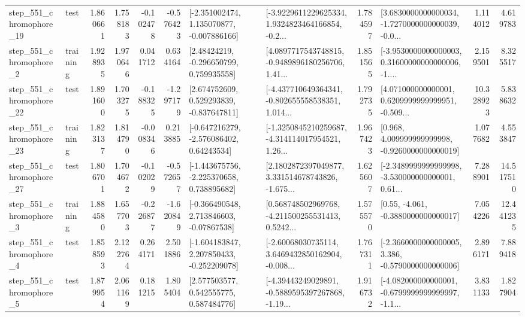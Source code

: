 \begin{tabular}{llrrrrllrlrr}
  step\_551\_chromophore\_19 &      test &      1.860661 &    1.758183 &     -0.102478 & -0.576423 &   [-2.351002474, 1.135070877, -0.007886166] &  [-3.9229611229625334, 1.9324823464166854, -0.2... &       1.784597 &  [3.6830000000000034, -1.7270000000000039, -0.0... &            1.114012 &          4.619783 \\
   step\_551\_chromophore\_2 &  training &      1.928935 &    1.970646 &      0.041712 &  0.634164 &     [2.48424219, -0.296650799, 0.759935558] &  [4.0897717543748815, -0.9489896180256706, 1.41... &       1.851565 &  [-3.9530000000000003, 0.31600000000000006, -1.... &            2.159501 &          8.325517 \\
  step\_551\_chromophore\_22 &      test &      1.891600 &    1.703275 &     -0.188325 & -1.297179 &    [2.674752609, 0.529293839, -0.837647811] &  [-4.437710649364341, -0.802655558538351, 1.014... &       1.792735 &  [4.071000000000001, 0.6209999999999951, -0.509... &           10.328923 &          5.838632 \\
  step\_551\_chromophore\_23 &  training &      1.823137 &    1.814790 &     -0.008346 &  0.213885 &    [-0.647216279, -2.576086402, 0.64243534] &  [-1.3250845210259687, -4.314114017954521, 1.26... &       1.967423 &    [0.968, 4.009999999999998, -0.9260000000000019] &            1.077682 &          4.553847 \\
  step\_551\_chromophore\_27 &      test &      1.806701 &    1.704672 &     -0.102029 & -0.572657 &   [-1.443675756, -2.225370658, 0.738895682] &  [2.1802872397049877, 3.331514678743826, -1.675... &       1.625607 &  [-2.3489999999999998, -3.530000000000001, 0.61... &            7.288901 &         14.517510 \\
   step\_551\_chromophore\_3 &  training &      1.884580 &    1.657703 &     -0.226877 & -1.620849 &    [-0.366490548, 2.713846603, -0.07867538] &  [0.568748502969768, -4.211500255531413, 0.5242... &       1.575570 &                [0.55, -4.061, -0.3880000000000017] &            7.054226 &         12.441235 \\
   step\_551\_chromophore\_4 &      test &      1.858593 &    2.122764 &      0.264171 &  2.501886 &   [-1.604183847, 2.207850433, -0.252209078] &  [-2.60068030735114, 3.6469432850162904, -0.008... &       1.767311 &  [-2.3660000000000005, 3.386, -0.5790000000000006] &            2.896171 &          7.889418 \\
   step\_551\_chromophore\_5 &      test &      1.879954 &    2.061169 &      0.181215 &  1.805404 &     [2.577503577, 0.542555775, 0.587484776] &  [-4.39443249029891, -0.5889595397267868, -1.19... &       1.916732 &  [-4.082000000000001, -0.6799999999999997, -1.1... &            3.831133 &          1.827904 \\

\end{tabular}
